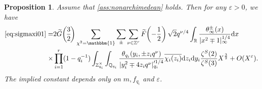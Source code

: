 \documentclass[10pt,oneside,reqno]{amsart}
\newcommand\rmd{\mathrm{d}}
\newcommand\QQ{\mathbb{Q}}
\newcommand\RR{\mathbb{R}}
\newcommand\ZZ{\mathbb{Z}}
\newcommand\triv{\mathbbm{1}}
\newcommand\legendresymbol[2]{\genfrac{(}{)}{}{}{#1}{#2}}
\theoremstyle{THEOREM}
\newtheorem{proposition}[theorem]{Proposition}
\theoremstyle{DEFINITION}
\theoremstyle{EXERCISE}
\numberwithin{equation}{section}
\begin{document}
\begin{proposition}\label{prop:sigmaxi01}
Assume that \autoref{ass:nonarchimedean} holds. Then for any $\varepsilon>0$, we have 
\begin{align*}
\eqref{eq:sigmaxi01}=&2\widetilde{G}\legendresymbol{3}{2}\sum_{\chi^2=\triv}\sum_{\pm}\sum_{\nu\in \ZZ^r}\widetilde{F}\!\left(-\frac12\right)\sqrt{2}q^{\nu/4} \int_{\RR}\frac{\theta_\infty^\pm(x)}{|x^2\mp 1|_\infty^{1/4}}\rmd x\\
\times&\prod_{i=1}^{r}(1-q_i^{-1})\int_{\ZZ_{q_i}^\times}\int_{\QQ_{q_i}}\frac{\theta_{q_i}(y_i,\pm z_i q^\nu)}{|y_i^2\mp 4z_iq^\nu|_{q_i}'^{1/4}}\overline{\chi_i(z_i)}\rmd z_i\rmd y_i \frac{\zeta^S(2)}{\zeta^S(3)}X^{\frac32}+O(X^\varepsilon).
\end{align*}
The implied constant depends only on $m,f_{q_i}$ and $\varepsilon$.
\end{proposition}
\end{document}

